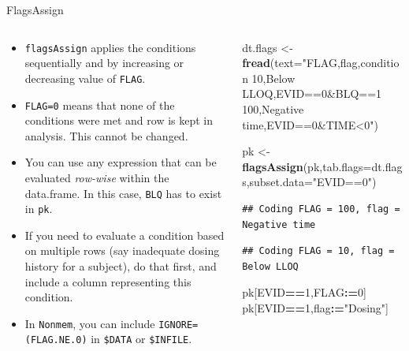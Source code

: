 \documentclass[
  8pt,
  ignorenonframetext,
  aspectratio=169]{beamer}
\newenvironment{Shaded}{\begin{snugshade}}{\end{snugshade}}
\newcommand{\DataTypeTok}[1]{\textcolor[rgb]{0.13,0.29,0.53}{#1}}
\newcommand{\DecValTok}[1]{\textcolor[rgb]{0.00,0.00,0.81}{#1}}
\newcommand{\ErrorTok}[1]{\textcolor[rgb]{0.64,0.00,0.00}{\textbf{#1}}}
\newcommand{\KeywordTok}[1]{\textcolor[rgb]{0.13,0.29,0.53}{\textbf{#1}}}
\newcommand{\NormalTok}[1]{#1}
\newcommand{\OperatorTok}[1]{\textcolor[rgb]{0.81,0.36,0.00}{\textbf{#1}}}
\newcommand{\StringTok}[1]{\textcolor[rgb]{0.31,0.60,0.02}{#1}}
\begin{document}
\begin{frame}[fragile]{FlagsAssign}
\protect\hypertarget{flagsassign}{}
\begin{columns}[T]
\begin{column}{0.48\textwidth}
\begin{itemize}
\item
  \texttt{flagsAssign} applies the conditions sequentially and by
  increasing or decreasing value of \texttt{FLAG}.
\item
  \texttt{FLAG=0} means that none of the conditions were met and row is
  kept in analysis. This cannot be changed.
\item
  You can use any expression that can be evaluated \emph{row-wise}
  within the data.frame. In this case, \texttt{BLQ} has to exist in
  \texttt{pk}.
\item
  If you need to evaluate a condition based on multiple rows (say
  inadequate dosing history for a subject), do that first, and include a
  column representing this condition.
\item
  In \texttt{Nonmem}, you can include \texttt{IGNORE=(FLAG.NE.0)} in
  \texttt{\$DATA} or \texttt{\$INFILE}.
\end{itemize}
\end{column}

\begin{column}{0.48\textwidth}
\footnotesize

\begin{Shaded}
\begin{Highlighting}[]
\NormalTok{dt.flags \textless{}{-}}\StringTok{ }\KeywordTok{fread}\NormalTok{(}\DataTypeTok{text=}\StringTok{"FLAG,flag,condition}
\StringTok{10,Below LLOQ,EVID==0\&BLQ==1}
\StringTok{100,Negative time,EVID==0\&TIME\textless{}0"}\NormalTok{)}

\NormalTok{pk \textless{}{-}}\StringTok{ }\KeywordTok{flagsAssign}\NormalTok{(pk,}\DataTypeTok{tab.flags=}\NormalTok{dt.flags,}\DataTypeTok{subset.data=}\StringTok{"EVID==0"}\NormalTok{)}
\end{Highlighting}
\end{Shaded}

\begin{verbatim}
## Coding FLAG = 100, flag = Negative time
\end{verbatim}

\begin{verbatim}
## Coding FLAG = 10, flag = Below LLOQ
\end{verbatim}

\begin{Shaded}
\begin{Highlighting}[]
\NormalTok{pk[EVID}\OperatorTok{==}\DecValTok{1}\NormalTok{,FLAG}\OperatorTok{:}\ErrorTok{=}\DecValTok{0}\NormalTok{]}
\NormalTok{pk[EVID}\OperatorTok{==}\DecValTok{1}\NormalTok{,flag}\OperatorTok{:}\ErrorTok{=}\StringTok{"Dosing"}\NormalTok{]}
\end{Highlighting}
\end{Shaded}
\end{column}
\end{columns}
\end{frame}
\end{document}
